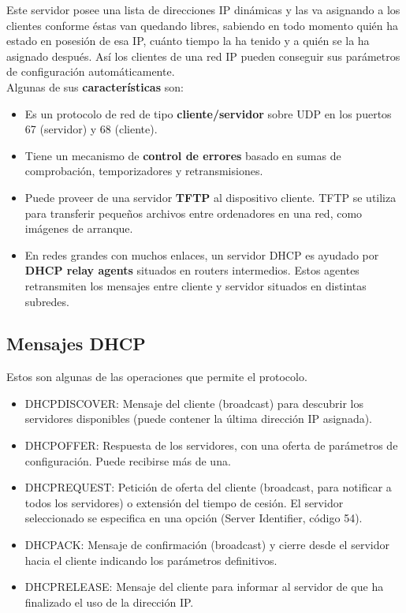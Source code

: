 Este servidor posee una lista de direcciones IP dinámicas y las va asignando a los clientes conforme éstas van quedando libres, sabiendo en todo momento quién ha estado en posesión de esa IP, cuánto tiempo la ha tenido y a quién se la ha asignado después. Así los clientes de una red IP pueden conseguir sus parámetros de configuración automáticamente.\\

Algunas de sus \textbf{características} son:
\begin{itemize}
    \item Es un protocolo de red de tipo \textbf{cliente/servidor} sobre UDP en los puertos 67 (servidor) y 68
(cliente).
    \item Tiene un mecanismo de \textbf{control de errores} basado en sumas de comprobación, temporizadores y retransmisiones.
    \item Puede proveer de una servidor \textbf{TFTP} al dispositivo cliente. TFTP se utiliza para transferir pequeños archivos entre ordenadores en una red, como imágenes de arranque.
    \item En redes grandes con muchos enlaces, un servidor DHCP es ayudado por \textbf{DHCP relay agents} situados en routers intermedios. Estos agentes retransmiten los mensajes entre cliente y servidor situados en distintas subredes.
\end{itemize}
\subsection{Mensajes DHCP}
Estos son algunas de las operaciones que permite el protocolo.
\begin{itemize}
    \item DHCPDISCOVER: Mensaje del cliente (broadcast) para descubrir los servidores disponibles (puede contener la última dirección IP asignada).
    \item DHCPOFFER: Respuesta de los servidores, con una oferta de parámetros de configuración. Puede
    recibirse más de una.
    \item DHCPREQUEST: Petición de oferta del cliente (broadcast, para notificar a todos los servidores) o extensión del tiempo de cesión. El servidor seleccionado se especifica en una opción (Server Identifier, código 54).
    \item DHCPACK: Mensaje de confirmación (broadcast) y cierre desde el servidor hacia el cliente indicando los parámetros definitivos.
    \item DHCPRELEASE: Mensaje del cliente para informar al servidor de que ha finalizado el uso de
    la dirección IP.
\end{itemize}
